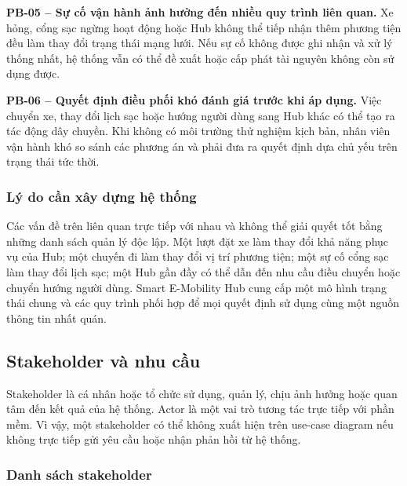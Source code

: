 \medskip
\noindent\textbf{PB-05 -- Sự cố vận hành ảnh hưởng đến nhiều quy trình liên quan.}
Xe hỏng, cổng sạc ngừng hoạt động hoặc Hub không thể tiếp nhận thêm phương tiện đều làm thay đổi trạng thái mạng lưới. Nếu sự cố không được ghi nhận và xử lý thống nhất, hệ thống vẫn có thể đề xuất hoặc cấp phát tài nguyên không còn sử dụng được.

\medskip
\noindent\textbf{PB-06 -- Quyết định điều phối khó đánh giá trước khi áp dụng.}
Việc chuyển xe, thay đổi lịch sạc hoặc hướng người dùng sang Hub khác có thể tạo ra tác động dây chuyền. Khi không có môi trường thử nghiệm kịch bản, nhân viên vận hành khó so sánh các phương án và phải đưa ra quyết định dựa chủ yếu trên trạng thái tức thời.

\subsubsection*{Lý do cần xây dựng hệ thống}

Các vấn đề trên liên quan trực tiếp với nhau và không thể giải quyết tốt bằng những danh sách quản lý độc lập. Một lượt đặt xe làm thay đổi khả năng phục vụ của Hub; một chuyến đi làm thay đổi vị trí phương tiện; một sự cố cổng sạc làm thay đổi lịch sạc; một Hub gần đầy có thể dẫn đến nhu cầu điều chuyển hoặc chuyển hướng người dùng. Smart E-Mobility Hub cung cấp một mô hình trạng thái chung và các quy trình phối hợp để mọi quyết định sử dụng cùng một nguồn thông tin nhất quán.

\subsection{Stakeholder và nhu cầu}

Stakeholder là cá nhân hoặc tổ chức sử dụng, quản lý, chịu ảnh hưởng hoặc quan tâm đến kết quả của hệ thống. Actor là một vai trò tương tác trực tiếp với phần mềm. Vì vậy, một stakeholder có thể không xuất hiện trên use-case diagram nếu không trực tiếp gửi yêu cầu hoặc nhận phản hồi từ hệ thống.

\subsubsection*{Danh sách stakeholder}

